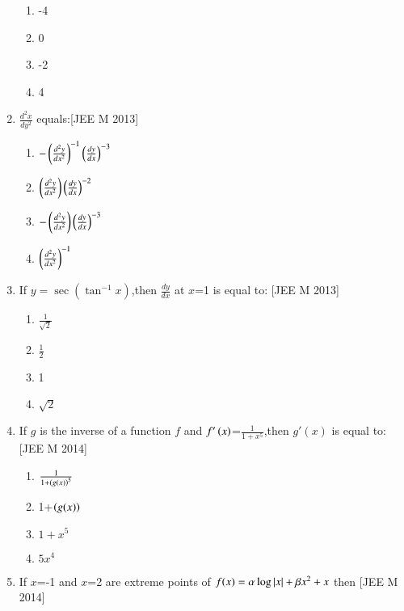 \documentclass[journal,12pt,twocolumn]{IEEEtran}
\theoremstyle{remark}
\begin{document}
\begin{enumerate}
\begin{multicols}{4}
     
	    \begin{enumerate}
	\item -4
	\item 0
	\item -2
	\item 4
	    \end{enumerate}
     \end{multicols}
    \item $\frac{d^2x}{dy^2}$ equals:\hfill[JEE M 2013]\break
    \begin{multicols}{2}
        
    
	    \begin{enumerate}
		    \item  $-\left({\frac{d^2y}{dx^2}}\right)^{-1}\left({\frac{dy}{dx}}\right)^{-3}$
		    \item $\left({\frac{d^2y}{dx^2}}\right)\left({\frac{dy}{dx}}\right)^{-2}$

		    \item $-\left({\frac{d^2y}{dx^2}}\right)\left({\frac{dy}{dx}}\right)^{-3}$
		    \item $\left(\frac{d^2y}{dx^2}\right)^{-1}$
	    \end{enumerate}
     \end{multicols}
    \item If $y=\sec(\tan^{-1}x)$,then $\frac{dy}{dx}$ at $x$=1 is equal to:
    \hfill[JEE M 2013]
\break
\begin{multicols}{2}
    

     \begin{enumerate}
     \item $\frac{1}{\sqrt{2}}$
     \item $\frac{1}{2}$
     \item 1
     \item $\sqrt{2}$
     \end{enumerate}
     \end{multicols}
      \item If $g$ is the inverse of a function $f$ and $f'\left(x\right)$=$\frac{1}{1+x^5}$,then $g'(x)$ is equal to:
      \hfill[JEE M 2014]\break
      \begin{multicols}{2}
          
      
      \begin{enumerate}
      \item $\frac{1}{1+\left({g(x)}\right)^5}$
      \item 1+$\left({g(x)}\right)$
      \item $1+x^5$
      \item $5x^4$
      \end{enumerate}
      \end{multicols}
      \item If $x$=-1 and $x$=2 are extreme points of $f(x)=\alpha\log\left\vert x\right\vert+\beta x^2+x$ then 
	      \hfill[JEE M 2014]
       \begin{multicols}{2}
           

\end{multicols}
\end{enumerate}
\end{document}
